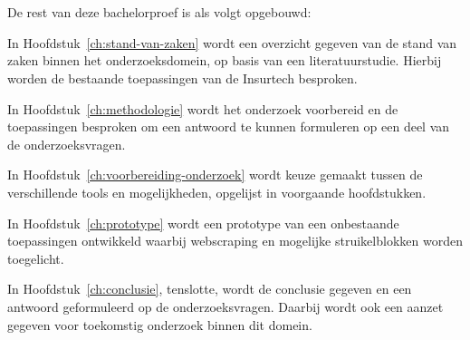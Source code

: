 \section{}
\label{sec:opzet-bachelorproef}


De rest van deze bachelorproef is als volgt opgebouwd:

In Hoofdstuk~\ref{ch:stand-van-zaken} wordt een overzicht gegeven van de stand van zaken binnen het onderzoeksdomein, op basis van een literatuurstudie. Hierbij worden de bestaande toepassingen van de Insurtech besproken.

In Hoofdstuk~\ref{ch:methodologie} wordt het onderzoek voorbereid en de toepassingen besproken om een antwoord te kunnen formuleren op een deel van de onderzoeksvragen.


In Hoofdstuk~\ref{ch:voorbereiding-onderzoek} wordt keuze gemaakt tussen de verschillende tools en mogelijkheden, opgelijst in voorgaande hoofdstukken.

In Hoofdstuk~\ref{ch:prototype} wordt een prototype van een onbestaande toepassingen ontwikkeld waarbij webscraping en mogelijke struikelblokken worden toegelicht.

In Hoofdstuk~\ref{ch:conclusie}, tenslotte, wordt de conclusie gegeven en een antwoord geformuleerd op de onderzoeksvragen. Daarbij wordt ook een aanzet gegeven voor toekomstig onderzoek binnen dit domein.